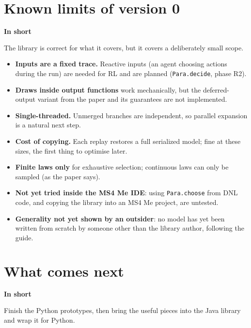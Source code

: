 \documentclass[11pt]{article}
\newcommand{\code}[1]{\texttt{#1}}
\newcommand{\shadedbox}[3]{\par\smallskip\noindent\colorbox{#1}{\parbox{\dimexpr\linewidth-2\fboxsep}{\textbf{#2}\par #3}}\par\smallskip}
\newcommand{\takeaway}[1]{\shadedbox{okbg}{In short}{#1}}
\begin{document}
\section{Known limits of version 0}\label{sec:limits}

\takeaway{The library is correct for what it covers, but it covers a deliberately small scope.}

\begin{itemize}
\item \textbf{Inputs are a fixed trace.} Reactive inputs (an agent choosing actions during the run) are needed for
  RL and are planned (\code{Para.decide}, phase R2).
\item \textbf{Draws inside output functions} work mechanically, but the deferred-output variant from the paper and its
  guarantees are not implemented.
\item \textbf{Single-threaded.} Unmerged branches are independent, so parallel expansion is a natural next step.
\item \textbf{Cost of copying.} Each replay restores a full serialized model; fine at these sizes, the first thing to
  optimise later.
\item \textbf{Finite laws only} for exhaustive selection; continuous laws can only be sampled (as the paper says).
\item \textbf{Not yet tried inside the MS4 Me IDE}: using \code{Para.choose} from DNL code, and copying the library
  into an MS4 Me project, are untested.
\item \textbf{Generality not yet shown by an outsider}: no model has yet been written from scratch by someone other
  than the library author, following the guide.
\end{itemize}

\section{What comes next}\label{sec:next}

\takeaway{Finish the Python prototypes, then bring the useful pieces into the Java library and wrap it for Python.}
\end{document}
